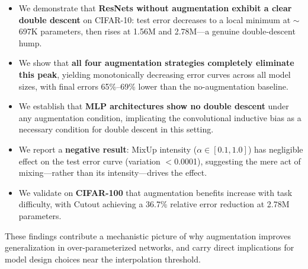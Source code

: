 \begin{itemize}
    \item We demonstrate that \textbf{ResNets without augmentation exhibit a clear double descent} on CIFAR-10: test error decreases to a local minimum at $\sim$697K parameters, then rises at 1.56M and 2.78M---a genuine double-descent hump.
    \item We show that \textbf{all four augmentation strategies completely eliminate this peak}, yielding monotonically decreasing error curves across all model sizes, with final errors 65\%--69\% lower than the no-augmentation baseline.
    \item We establish that \textbf{MLP architectures show no double descent} under any augmentation condition, implicating the convolutional inductive bias as a necessary condition for double descent in this setting.
    \item We report a \textbf{negative result}: MixUp intensity ($\alpha \in [0.1, 1.0]$) has negligible effect on the test error curve (variation $<$0.0001), suggesting the mere act of mixing---rather than its intensity---drives the effect.
    \item We validate on \textbf{CIFAR-100} that augmentation benefits increase with task difficulty, with Cutout achieving a 36.7\% relative error reduction at 2.78M parameters.
\end{itemize}

These findings contribute a mechanistic picture of why augmentation improves generalization in over-parameterized networks, and carry direct implications for model design choices near the interpolation threshold.
